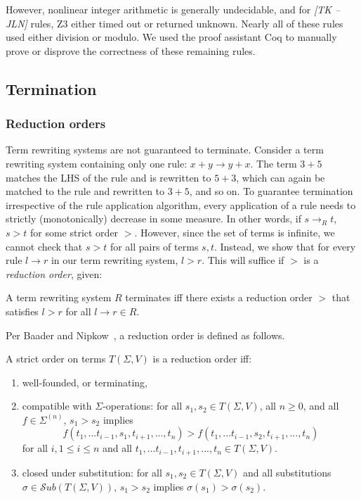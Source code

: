 \documentclass[sigplan,review,anonymous]{acmart}\settopmatter{printfolios=true,printccs=false,printacmref=false}
\newcommand{\jln}[1]{\textcolor{uwpurple}{\textit{[{#1} --JLN]}}}
\begin{document}
However, nonlinear integer arithmetic is generally undecidable, and for \jln{TK} rules, Z3 either timed out or returned unknown. Nearly all of these rules used either division or modulo. We used the proof assistant Coq to manually prove or disprove the correctness of these remaining rules. 
\subsection{Termination}

\subsubsection{Reduction orders}

Term rewriting systems are not guaranteed to terminate. Consider a term rewriting system containing only one rule: $x + y \rightarrow y + x$. The term $3 + 5$ matches the LHS of the rule and is rewritten to $5 + 3$, which can again be matched to the rule and rewritten to $3 + 5$, and so on. To guarantee termination irrespective of the rule application algorithm, every application of a rule needs to strictly (monotonically) decrease in some measure. In other words, if $s \rightarrow_R t$, $s > t$ for some strict order $>$. However, since the set of terms is infinite, we cannot check that $s > t$ for all pairs of terms $s, t$. Instead, we show that for every rule $l \rightarrow r$ in our term rewriting system, $l > r$. This will suffice if $>$ is a \emph{reduction order}, given:

\begin{theorem}\label{theorem:terminates}
A term rewriting system $R$ terminates iff there exists a reduction order $>$ that satisfies $l > r$ for all $l \rightarrow r \in R$.
\end{theorem}

Per Baader and Nipkow~\cite{baader1999term}, a reduction order is defined as follows.

\begin{definition}
A strict order on terms $T(\Sigma, V)$ is a reduction order iff: 
\begin{enumerate}
    \item well-founded, or terminating,
    \item compatible with $\Sigma$-operations: for all $s_1, s_2 \in T(\Sigma,V)$, all $n \geq 0$, and all $f \in \Sigma^{(n)}$, $s_1 > s_2$ implies
    \[ f(t_1,...t_{i-1},s_1,t_{i+1},...,t_n) > f(t_1,...t_{i-1},s_2,t_{i+1},...,t_n)
    \]
    for all $i, 1 \leq i \leq n$ and all $t_1,...t_{i-1},t_{i+1},...,t_n \in T(\Sigma,V)$.
    \item closed under substitution: for all $s_1, s_2 \in T(\Sigma,V)$ and all substitutions $\sigma \in \mathcal{S}ub(T(\Sigma,V))$, $s_1 > s_2$ implies $\sigma(s_1) > \sigma(s_2)$.
\end{enumerate}
\end{definition}
\end{document}
